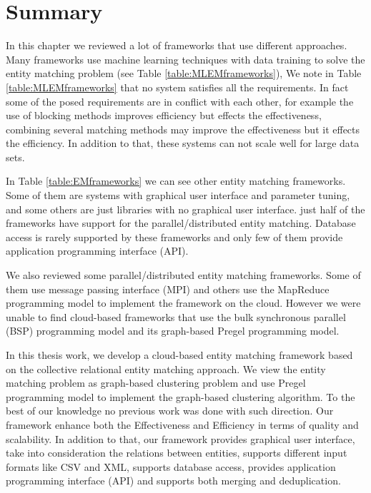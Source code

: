 \section{Summary}
In this chapter we reviewed a lot of frameworks that use different approaches. Many frameworks use machine learning techniques with data training to solve the entity matching problem (see Table \ref{table:MLEMframeworks}), We note in Table \ref{table:MLEMframeworks} that no system satisfies all the requirements. In fact some of the posed requirements are in conflict with each other, for example the use of blocking methods improves efficiency but effects the effectiveness, combining several matching methods may improve the effectiveness but it effects the efficiency. In addition to that, these systems can not scale well for large data sets.
 
In Table \ref{table:EMframeworks} we can see other entity matching frameworks. Some of them are systems with graphical user interface and parameter tuning, and some others are just libraries with no graphical user interface. just half of the frameworks have support for the parallel/distributed entity matching. Database access is rarely supported by these frameworks and only few of them provide application programming interface (API).

We also reviewed some parallel/distributed entity matching frameworks. Some of them use message passing interface (MPI) and others use the MapReduce programming model to implement the framework on the cloud. However we were unable to find cloud-based frameworks that use the bulk synchronous parallel (BSP) programming model and its graph-based Pregel programming model.

In this thesis work, we develop a cloud-based entity matching framework based on the collective relational entity matching approach. We view the entity matching problem as graph-based clustering problem and use Pregel programming model to implement the graph-based clustering algorithm. To the best of our knowledge no previous work was done with such direction. Our framework enhance both the Effectiveness and Efficiency in terms of quality and scalability. In addition to that, our framework provides graphical user interface, take into consideration the relations between entities, supports different input formats like CSV and XML, supports database access, provides application programming interface (API) and supports both merging and deduplication. 


